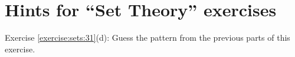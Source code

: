 \section{Hints for ``Set Theory'' exercises}\label{sec:set_chapter:hints}

\noindent Exercise \ref{exercise:sets:31}(d): Guess the pattern from the previous parts of this exercise.
